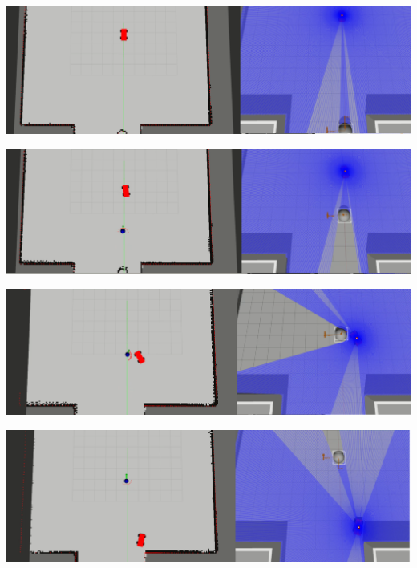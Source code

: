 \begin{minipage}{\textwidth}
    \includegraphics[width=\textwidth]{figures/raw/local_planner_test_straight_traj_dyn_obj_1.png}

    \vspace{0.5cm}
    \includegraphics[width=\textwidth]{figures/raw/local_planner_test_straight_traj_dyn_obj_2.png}

    \vspace{0.5cm}
    \includegraphics[width=\textwidth]{figures/raw/local_planner_test_straight_traj_dyn_obj_3.png}

    \vspace{0.5cm}
    \includegraphics[width=\textwidth]{figures/raw/local_planner_test_straight_traj_dyn_obj_4.png}

    \label{local_planner_test_straight_traj_dyn_obj}
\end{minipage}


